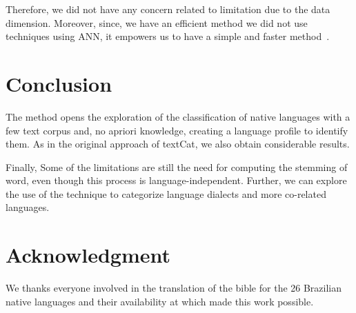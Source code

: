 \documentclass[runningheads]{llncs}
\begin{document}
    Therefore, we did not have any concern related to limitation due to the data dimension. Moreover, since, we have an efficient method we did not use techniques using ANN, it empowers us to have a simple and faster method~\cite{kp2019deep}.


    \section{Conclusion}\label{sec:conclusion}

    The method opens the exploration of the classification of native languages with a few text corpus and, no apriori knowledge, creating a language profile to identify them. As in the original approach of textCat, we also obtain considerable results.

    Finally, Some of the limitations are still the need for computing the stemming of word, even though this process is language-independent. Further, we can explore the use of the technique to categorize language dialects and more co-related languages.


    \section*{Acknowledgment}

    We thanks everyone involved in the translation of the bible for the 26 Brazilian native languages and their availability at \cite{angelo} which made this work possible.

    
    
\end{document}
